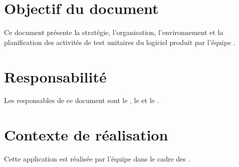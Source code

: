 \section*{Objectif du document}
	Ce document présente la stratégie, l'organisation, l’environnement et la planification des activités de test unitaires du logiciel produit par l'équipe \nomEquipe{}.
	
\section*{Responsabilité}
	Les responsables de ce document sont le \CP, le \RQ{} et le \RD.
	
\section*{Contexte de réalisation}
	Cette application est réalisée par l'équipe \nomEquipe{} dans le cadre des \PIC.

